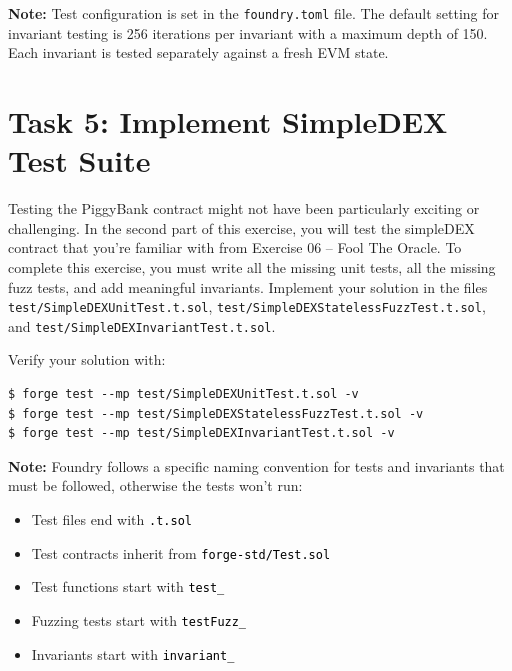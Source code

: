\documentclass[12pt]{article}
\newcommand{\codegrey}[1]{%
  \texttt{\colorbox{black!4}{\textcolor{black}{#1}}}%
}
\begin{document}
\noindent
\textbf{Note:} Test configuration is set in the \texttt{foundry.toml} file. The default setting for invariant testing is 256 iterations per invariant with a maximum depth of 150. Each invariant is tested separately against a fresh EVM state.

\section*{Task 5: Implement SimpleDEX Test Suite}

Testing the PiggyBank contract might not have been particularly exciting or
challenging. In the second part of this exercise, you will test the simpleDEX
contract that you're familiar with from Exercise 06 -- Fool The Oracle. To
complete this exercise, you must write all the missing unit tests, all the
missing fuzz tests, and add meaningful invariants. Implement your solution in
the files \texttt{test/SimpleDEXUnitTest.t.sol},
\texttt{test/SimpleDEXStatelessFuzzTest.t.sol}, and
\texttt{test/SimpleDEXInvariantTest.t.sol}.

\medskip
\noindent
Verify your solution with:

\noindent \begin{minipage}{\textwidth}
    \begin{verbatim}
$ forge test --mp test/SimpleDEXUnitTest.t.sol -v
$ forge test --mp test/SimpleDEXStatelessFuzzTest.t.sol -v
$ forge test --mp test/SimpleDEXInvariantTest.t.sol -v
\end{verbatim}
\end{minipage}

\noindent
\textbf{Note:} Foundry follows a specific naming convention for tests and invariants that must be followed, otherwise the tests won't run:

\begin{itemize}
    \item Test files end with \codegrey{.t.sol}
    \item Test contracts inherit from \codegrey{forge-std/Test.sol}
    \item Test functions start with \codegrey{test\_}
    \item Fuzzing tests start with \codegrey{testFuzz\_}
    \item Invariants start with \codegrey{invariant\_}
\end{itemize}
\end{document}
